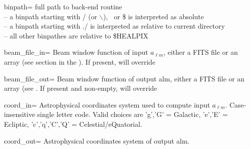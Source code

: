 \begin{keywords}
  \begin{kwlist}{} %

 \item[binpath=]  full path to back-end routine \\
              -- a binpath starting with / (or $\backslash$), $~$ or \$ is interpreted as absolute\\
              -- a binpath starting with ./ is interpreted as relative to current directory\\
              -- all other binpathes are relative to \$HEALPIX

 \item[beam\_file\_in=] Beam window function of input $a_{\ell m}$,
                 either a FITS file or an array 
		(see  section
		in the ). 
		If present, will override

 \item[beam\_file\_out=]  Beam window function of output alm, 
                 either a FITS file or an array (see . 
		If present and non-empty, will override

 \item[coord\_in=]      Astrophysical coordinates system used to compute input $a_{\ell m}$.
                 Case-insensitive single letter code.
                 Valid choices are 'g','G' = Galactic, 'e','E' = Ecliptic,
                 'c','q','C','Q' = Celestial/eQuatorial.

 \item[coord\_out=]     Astrophysical coordinates system of output alm.


\end{kwlist}
\end{keywords}
